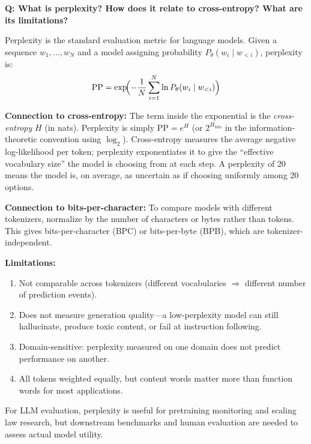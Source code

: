 \vspace{0.5em}

\begin{interviewq}
\textbf{Q: What is perplexity? How does it relate to cross-entropy? What are its
limitations?}

 \quad {} \quad \badgefreq{\freqhigh}

\stronganswer
Perplexity is the standard evaluation metric for language models.  Given a
sequence $w_1, \ldots, w_N$ and a model assigning probability
$P_\theta(w_i \mid w_{<i})$, perplexity is:
\[
    \text{PP} = \exp\!\Bigl(-\frac{1}{N}\sum_{i=1}^{N}\ln P_\theta(w_i \mid w_{<i})\Bigr)
\]

\textbf{Connection to cross-entropy:}  The term inside the exponential is the
\emph{cross-entropy} $H$ (in nats).  Perplexity is simply $\text{PP} = e^H$
(or $2^{H_{\text{bits}}}$ in the information-theoretic convention using
$\log_2$).  Cross-entropy measures the average negative log-likelihood per
token; perplexity exponentiates it to give the ``effective vocabulary size'' the
model is choosing from at each step.  A perplexity of 20 means the model is, on
average, as uncertain as if choosing uniformly among 20 options.

\textbf{Connection to bits-per-character:}  To compare models with different
tokenizers, normalize by the number of characters or bytes rather than tokens.
This gives bits-per-character (BPC) or bits-per-byte (BPB), which are
tokenizer-independent.

\textbf{Limitations:}
\begin{enumerate}
    \item Not comparable across tokenizers (different vocabularies $\Rightarrow$
          different number of prediction events).
    \item Does not measure generation quality---a low-perplexity model can still
          hallucinate, produce toxic content, or fail at instruction following.
    \item Domain-sensitive: perplexity measured on one domain does not predict
          performance on another.
    \item All tokens weighted equally, but content words matter more than
          function words for most applications.
\end{enumerate}

For LLM evaluation, perplexity is useful for pretraining monitoring and scaling
law research, but downstream benchmarks and human evaluation are needed to assess
actual model utility.


\end{interviewq}
